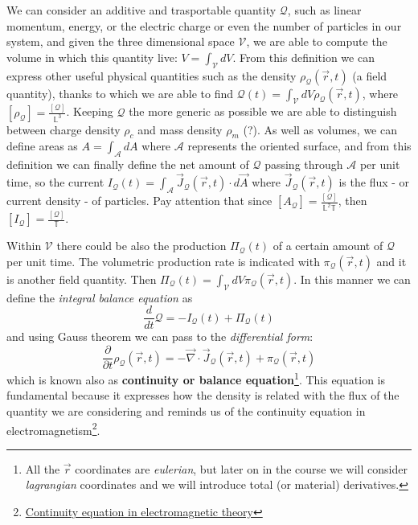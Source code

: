 \documentclass[../main/main.tex]{subfiles}
\begin{document}
We can consider an additive and trasportable quantity $\mathcal{Q}$, such as linear momentum, energy, or the electric charge or even the number of particles in our system, and given the three dimensional space $\mathcal{V}$, we are able to compute the volume in which this quantity live: $V=\int_{\mathcal{V}}dV$. From this definition we can express other useful physical quantities such as the density $\rho_{\mathcal{Q}}(\vec{r}, t)$ (a field quantity), thanks to which we are able to find $\mathcal{Q}(t)=\int_{\mathcal{V}}dV\rho_{\mathcal{Q}}(\vec{r}, t)$, where
$[\rho_{\mathcal{Q}}]=\frac{[\mathcal{Q}]}{\mathbb{L}^3}$. Keeping $\mathcal{Q}$ the more generic as possible we are able to distinguish between charge density $\rho_c$ and mass density $\rho_m$ (?).
As well as volumes, we can define areas as $A=\int_{\mathcal{A}}dA$ where $\mathcal{A}$ represents the oriented surface, and from this definition we can finally define the net amount of $\mathcal{Q}$ passing through $\mathcal{A}$ per unit time, so the current $I_{\mathcal{Q}}(t)=\int_{\mathcal{A}}\vec{J}_{\mathcal{Q}}(\vec{r},t)\cdot d\vec{A}$ where $\vec{J}_{\mathcal{Q}}(\vec{r},t)$ is the flux - or current density - of particles. Pay attention that since $[A_{\mathcal{Q}}]=\frac{[\mathcal{Q}]}{\mathbb{L^2 T}}$, then $[I_{\mathcal{Q}}]=\frac{[\mathcal{Q}]}{\mathbb{T}}$.

Within $\mathcal{V}$ there could be also the production $\Pi_{\mathcal{Q}}(t)$ of a certain amount of $\mathcal{Q}$ per unit time. The volumetric production rate is indicated with $\pi_{\mathcal{Q}}(\vec{r},t)$ and it is another field quantity. Then $\Pi_{\mathcal{Q}}(t) = \int_{\mathcal{V}}dV\pi_{\mathcal{Q}}(\vec{r},t)$. In this manner we can define the \emph{integral balance equation} as $$\frac{d}{dt}\mathcal{Q}=-I_{\mathcal{Q}}(t)+\Pi_{\mathcal{Q}}(t)$$ and using Gauss theorem we can pass to the \emph{differential form}: 
\begin{equation}
    \frac{\partial}{\partial t}\rho_{\mathcal{Q}}(\vec{r},t)=-\vec{\nabla}\cdot\vec{J}_{\mathcal{Q}}(\vec{r},t)+\pi_{\mathcal{Q}}(\vec{r},t)
\end{equation}
which is known also as \textbf{continuity or balance equation}\footnote{All the $\vec{r}$ coordinates are \emph{eulerian}, but later on in the course we will consider \emph{lagrangian} coordinates and we will introduce total (or material) derivatives.}. This equation is fundamental because it expresses how the density is related with the flux of the quantity we are considering and reminds us of the continuity equation in electromagnetism\footnote{\href{https://en.wikipedia.org/wiki/Continuity_equation\#Differential_form}{Continuity equation in electromagnetic theory}}. 
\end{document}
